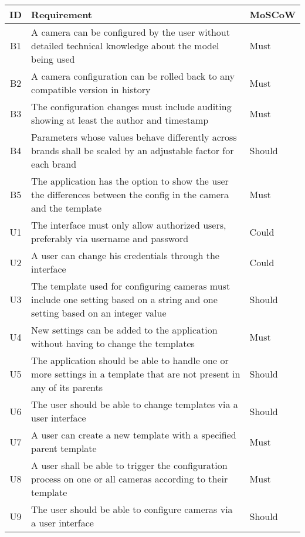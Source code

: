 \begin{table*}[h]
    \centering
    \begin{tabulary}{\linewidth}{CLL}
        \textbf{ID} & \textbf{Requirement} & \textbf{MoSCoW}
        \\ \hline
        B1 & A camera can be configured by the user without detailed technical knowledge about the model being used & Must
        \\ \hline
        B2 & A camera configuration can be rolled back to any compatible version in history & Must
        \\ \hline
        B3 & The configuration changes must include auditing showing at least the author and timestamp & Must
        \\ \hline
        B4 & Parameters whose values behave differently across brands shall be scaled by an adjustable factor for each brand & Should
        \\ \hline
        B5 & The application has the option to show the user the differences between the config in the camera and the template & Must
        \\ \hline
        U1 & The interface must only allow authorized users, preferably via username and password & Could
        \\ \hline
        U2 & A user can change his credentials through the interface & Could
        \\ \hline
        U3 & The template used for configuring cameras must include one setting based on a string and one setting based on an integer value & Should
        \\ \hline
        U4 & New settings can be added to the application without having to change the templates & Must
        \\ \hline
        U5 & The application should be able to handle one or more settings in a template that are not present in any of its parents & Should
        \\ \hline
        U6 & The user should be able to change templates via a user interface & Should
        \\ \hline
        U7 & A user can create a new template with a specified parent template & Must
        \\ \hline
		U8 & A user shall be able to trigger the configuration process on one or all cameras according to their template & Must
		\\ \hline
		U9 & The user should be able to configure cameras via a user interface & Should

\end{tabulary}
\end{table*}
